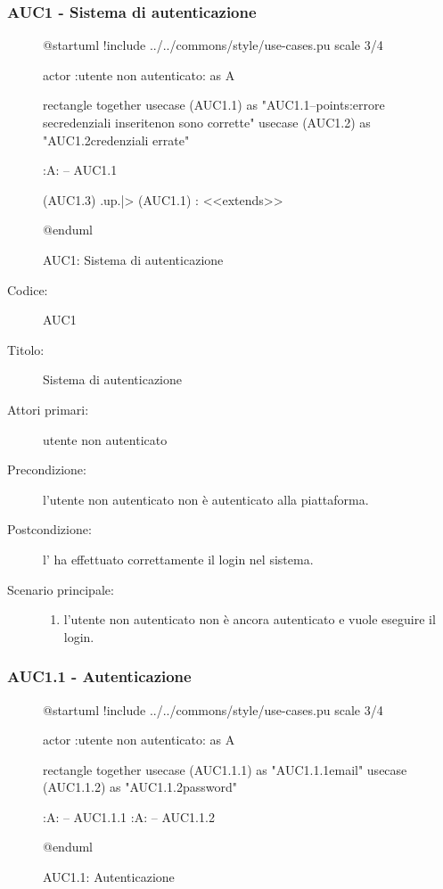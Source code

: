 \documentclass[casi-duso]{subfiles}
\begin{document}
\subsubsection{AUC1 - Sistema di autenticazione}%
\label{subsub:AUC1}

\begin{figure}[h!]
  \centering
  \begin{plantuml}
  @startuml
  !include ../../commons/style/use-cases.pu
  scale 3/4

  actor :utente non autenticato: as A

  rectangle {
    together {
      usecase (AUC1.1) as "AUC1.1\nAutenticazione\n--\nExtension points:\nVisualizzazione errore se\nle credenziali inserite\n non sono corrette"
      usecase (AUC1.2) as "AUC1.2\nVisualizzazione credenziali errate"
    }
  }

  :A: -- AUC1.1

  (AUC1.3) .up.|> (AUC1.1) : <<extends>>

  @enduml
  \end{plantuml}
  \caption{AUC1: Sistema di autenticazione}
  \label{fig:auc1}
\end{figure}

\begin{description}
  \item[Codice:] AUC1
  \item[Titolo:] Sistema di autenticazione
  \item[Attori primari:] utente non autenticato
  \item[Precondizione:] l'utente non autenticato non è autenticato alla piattaforma.
  \item[Postcondizione:] l' ha effettuato correttamente il login nel sistema.
  \item[Scenario principale:]
  \begin{enumerate}
    \item l'utente non autenticato non è ancora autenticato e vuole eseguire il login.
  \end{enumerate}
\end{description}

\subsubsection{AUC1.1 - Autenticazione}%
\label{subsub:AUC1.1}

\begin{figure}[h!]
  \centering
  \begin{plantuml}
  @startuml
  !include ../../commons/style/use-cases.pu
  scale 3/4

  actor :utente non autenticato: as A

  rectangle {
    together {
    usecase (AUC1.1.1) as "AUC1.1.1\nInserimento email"
    usecase (AUC1.1.2) as "AUC1.1.2\nInserimento password"
    }
  }

  :A: -- AUC1.1.1
  :A: -- AUC1.1.2

  @enduml
  \end{plantuml}
  \caption{AUC1.1: Autenticazione}
  \label{fig:auc1_1}
\end{figure}
\end{document}
